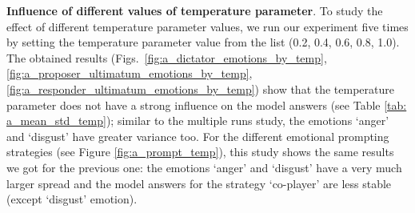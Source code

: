 \documentclass{article}
\begin{document}
\textbf{Influence of different values of temperature parameter}. To study the effect of different temperature parameter values, we run our experiment five times by setting the temperature parameter value from the list (0.2, 0.4, 0.6, 0.8, 1.0). The obtained results (Figs.~\ref{fig:a_dictator_emotions_by_temp}, \ref{fig:a_proposer_ultimatum_emotions_by_temp}, \ref{fig:a_responder_ultimatum_emotions_by_temp}) show that the temperature parameter does not have a strong influence on the model answers (see Table \ref{tab: a_mean_std_temp}); similar to the multiple runs study, the emotions `anger' and `disgust' have greater variance too.
For the different emotional prompting strategies (see Figure \ref{fig:a_prompt_temp}), this study shows the same results we got for the previous one: the emotions `anger' and `disgust' have a very much larger spread and the model answers for the strategy `co-player' are less stable (except `disgust' emotion).
\end{document}
